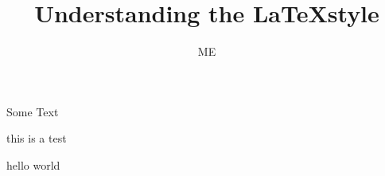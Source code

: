\documentclass{article}
\title{Understanding the \LaTeX style}
\author{ME}
\date{}
\begin{document}
    \maketitle

    Some Text


    this is a test



    hello world
\end{document}
